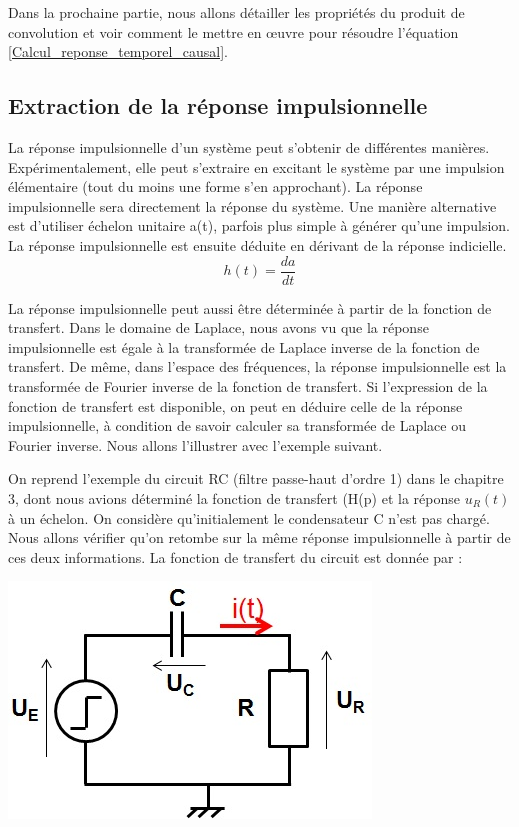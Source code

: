 	Dans la prochaine partie, nous allons détailler les propriétés du produit de convolution et voir comment le mettre en œuvre pour résoudre l'équation \ref{Calcul_reponse_temporel_causal}.
	
	\subsection{Extraction de la réponse impulsionnelle}
	
	La réponse impulsionnelle d'un système peut s'obtenir de différentes manières. Expérimentalement, elle peut s'extraire en excitant le système par une impulsion élémentaire (tout du moins une forme s'en approchant). La réponse impulsionnelle sera directement la réponse du système. Une manière alternative est d'utiliser échelon unitaire a(t), parfois plus simple à générer qu'une impulsion. La réponse impulsionnelle est ensuite déduite en dérivant de la réponse indicielle.
	\begin{equation}\label{key}
	h(t)=\frac{da}{dt}
	\end{equation}
	
	La réponse impulsionnelle peut aussi être déterminée à partir de la fonction de transfert. Dans le domaine de Laplace, nous avons vu que la réponse impulsionnelle est égale à la transformée de Laplace inverse de la fonction de transfert. De même, dans l'espace des fréquences, la réponse impulsionnelle est la transformée de Fourier inverse de la fonction de transfert. Si l'expression de la fonction de transfert est disponible, on peut en déduire celle de la réponse impulsionnelle, à condition de savoir calculer sa transformée de Laplace ou Fourier inverse. Nous allons l'illustrer avec l'exemple suivant.
	
	
	
	\begin{minipage}[l]{0.6\linewidth}
		On reprend l'exemple du circuit RC (filtre passe-haut d'ordre 1) dans le chapitre 3, dont nous avions déterminé la fonction de transfert (H(p) et la réponse $u_{R}(t)$ à un échelon. On considère qu'initialement le condensateur C n'est pas chargé. Nous allons vérifier qu'on retombe sur la même réponse impulsionnelle à partir de ces deux informations. La fonction de transfert du circuit est donnée par :
	\end{minipage} \hfill
	\begin{minipage}[c]{0.50\linewidth}
		\includegraphics[scale=0.7]{images/circuit_RC_reponse_indicielle.jpg}	
	\end{minipage}

